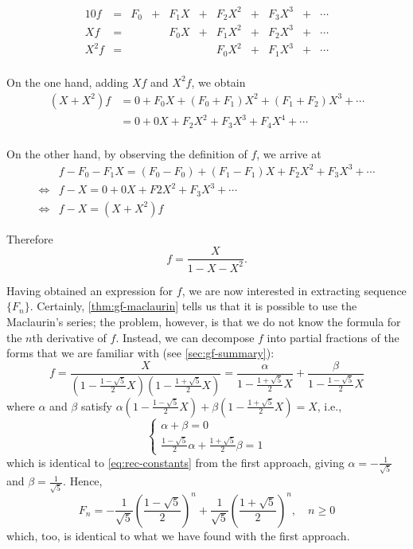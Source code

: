 \documentclass[a4paper, 12pt]{report}
\begin{document}
\begin{alignat*}{10}
f &= &F_0 &+ &F_1 X &+ &F_2 X^2 &+ &F_3 X^3 &+ &\cdots\\
X f &= & & &F_0 X &+ &F_1 X^2 &+ &F_2 X^3 &+ &\cdots\\
X^2 f &= & & & & &F_0 X^2 &+ &F_1 X^3 &+ &\cdots\\
\end{alignat*}

On the one hand, adding $X f$ and $X^2 f$, we obtain
\begin{align*}
    (X + X^2) f 
    &= 0 + F_0 X + (F_0 + F_1) X^2 + (F_1 + F_2) X^3 + \cdots\\
    &= 0 + 0 X + F_2 X^2 + F_3 X^3 + F_4 X^4 + \cdots\\
\end{align*}

On the other hand, by observing the definition of $f$, we arrive at
\begin{align*}
    &f - F_0 - F_1 X = (F_0 - F_0) + (F_1 - F_1)X + F_2 X^2 + F_3 X^3 + \cdots\\
    \iff &f - X = 0 + 0X + F2 X^2 + F_3 X^3 + \cdots\\
    \iff &f - X = (X + X^2) f
\end{align*}

Therefore \[f = \frac{X}{1 - X - X^2}.\]

Having obtained an expression for $f$, we are now interested in extracting sequence $\{F_n\}$. Certainly, \cref{thm:gf-maclaurin} tells us that it is possible to use the Maclaurin's series; the problem, however, is that we do not know the formula for the $n$th derivative of $f$. Instead, we can decompose $f$ into partial fractions of the forms that we are familiar with (see \cref{sec:gf-summary}):
\[
    f
    = \frac{X}{
     (1 - \frac{1 - \sqrt{5}}{2} X)
     (1 - \frac{1 + \sqrt{5}}{2} X)
    }
    = \frac{\alpha}{1 - \frac{1 + \sqrt{5}}{2} X} + \frac{\beta}{1 - \frac{1 - \sqrt{5}}{2} X}
\]
where $\alpha$ and $\beta$ satisfy $\alpha(1 - \frac{1 - \sqrt{5}}{2}X) + \beta(1 - \frac{1 + \sqrt{5}}{2}X) = X$, i.e.,
\[
\begin{cases}
\alpha + \beta = 0\\
\frac{1 - \sqrt{5}}{2} \alpha + \frac{1 + \sqrt{5}}{2} \beta = 1
\end{cases}
\]
which is identical to \cref{eq:rec-constants} from the first approach, giving $\alpha = -\frac{1}{\sqrt{5}}$ and $\beta = \frac{1}{\sqrt{5}}$. Hence, 
\[
F_n = -\frac{1}{\sqrt{5}} \left(\frac{1 - \sqrt{5}}{2}\right)^n + \frac{1}{\sqrt{5}} \left(\frac{1 + \sqrt{5}}{2}\right)^n, \quad n \geq 0
\]
which, too, is identical to what we have found with the first approach. 
\end{document}
